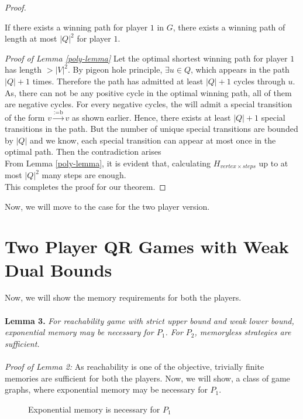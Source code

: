 \begin{proof}
\begin{lemma}
 \label{poly-lemma}
  If there exists a winning path for player $1$ in $G$, there exists a winning path of length at most $|Q|^2$ for player $1$.
  \end{lemma}
  \vskip 0.1cm
  \textit{Proof of Lemma \ref{poly-lemma}} Let the optimal shortest winning path for player $1$ has length $>|V|^2$. By pigeon hole principle, $\exists u \in Q$, which appears in the path $|Q|+1$ times. Therefore the path has admitted at least $|Q|+1$ cycles through $u$. As, there can not be any positive cycle in the optimal winning path, all of them are negative cycles. For every negative cycles, the will admit a special transition of the form $v \xrightarrow{\text{:=b}} v$ as shown earlier. Hence, there exists at least $|Q|+1$ special transitions in the path. But the number of unique special transitions are bounded by $|Q|$ and we know, each special transition can appear at most once in the optimal path. Then the contradiction arises\\
 \vskip 0.3cm
  From Lemma \ref{poly-lemma}, it is evident that, calculating $H_{vertex \times steps}$ up to at most $|Q|^2$ many steps are enough.\\
  This completes the proof for our theorem.
 \end{proof}
 \vskip 0.1cm
 Now, we will move to the case for the two player version.
 
 
\section{Two Player QR Games with Weak Dual Bounds}

Now, we will show the memory requirements for both the players.\\
\\
\textbf{Lemma 3.}  \textit{For reachability game with strict upper bound and weak lower bound, exponential memory may be necessary for $P_1$. For $P_2$, memoryless strategies are sufficient.}\\
\\
\textit{Proof of Lemma 2:} As reachability is one of the objective, trivially finite memories are sufficient for both the players. Now, we will show, a class of game graphs, where exponential memory may be necessary for $P_1$.\\
\begin{figure}[htb]
\hskip 6cm
\caption{Exponential memory is necessary for $P_1$ }
\end{figure}

